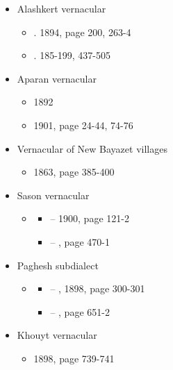 \begin{itemize}
\begin{itemize}
\begin{itemize}
		\end{itemize}
		\item Alashkert vernacular
		\begin{itemize}
			\item {}. 1894, page 200, 263-4
			\item {}. 185-199,  437-505
			
		\end{itemize}
		\item Aparan vernacular
		\begin{itemize}
			\item {} 1892
			\item {} 1901, page 24-44, 74-76
			
		\end{itemize}
		\item Vernacular of New Bayazet villages
		\begin{itemize}
			\item {} 1863, page 385-400
			
		\end{itemize}
		\item Sason vernacular
		\begin{itemize}
			\item {} 
			\begin{itemize}
				\item –  1900, page 121-2
				\item – , page 470-1
			\end{itemize}
			
		\end{itemize}
		\item Paghesh subdialect
		\begin{itemize}
			\item {}
			\begin{itemize}
				\item – , 1898, page 300-301
				\item – , page 651-2
			\end{itemize}
			
		\end{itemize}
		\item Khouyt vernacular
		\begin{itemize}
			\item {} 1898, page 739-741
			
		\end{itemize}
	\end{itemize}
\end{itemize}

